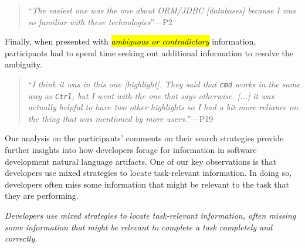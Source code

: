 \smallskip
\begin{quote}
    ``\textit{The easiest one was the one about ORM/JDBC [databases] because I was so familiar with these technologies}''---P2
\end{quote}




Finally, when presented with \hl{\textit{ambiguous or contradictory}} information, participants had to spend time seeking out additional information to resolve the ambiguity.


\smallskip
\begin{quote}
    ``\textit{I think it was in this one [highlight]. They said that \texttt{cmd} works in the same way as \texttt{Ctrl}, but I went with the one that says otherwise. [...] it was actually helpful to have two other highlights so I had a bit more reliance on the thing that was mentioned by more users.}''---P19
\end{quote}



Our analysis on the participants' comments on their search strategies provide further insights into how developers forage for information in software development natural language artifacts. One of our key observations is that  developers use mixed strategies to locate task-relevant information. In doing so, developers often miss some information that might be relevant to the task that they are performing.


\medskip
\begin{bluequote}
    \textit{Developers use mixed strategies to locate task-relevant information, often missing some information that might be relevant to complete a task completely and correctly.}
\end{bluequote}

